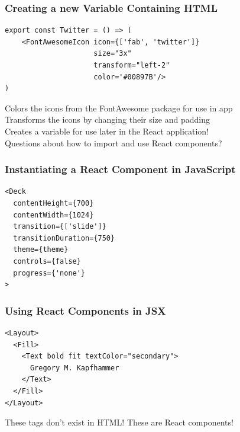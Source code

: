 \documentclass[14pt,aspectratio=169]{beamer}
\begin{document}
%
\begin{frame}[fragile]
  \frametitle{Creating a new Variable Containing HTML}
  \normalsize
  \hspace*{-.05in}
  \begin{minipage}{6in}
    \vspace*{.1in}
    \begin{verbatim}
export const Twitter = () => (
    <FontAwesomeIcon icon={['fab', 'twitter']}
                     size="3x"
                     transform="left-2"
                     color='#00897B'/>
)
    \end{verbatim}
  \end{minipage}
  \vspace*{.05in}
  \begin{center}
     Colors the icons from the FontAwesome package for use in app \\
     Transforms the icons by changing their size and padding \\
     Creates a variable for use later in the React application! \\
     Questions about how to import and use React components?
  \end{center}
\end{frame}

%
\begin{frame}[fragile]
  \frametitle{Instantiating a React Component in JavaScript}
  \normalsize
  \hspace*{.2in}
  \begin{minipage}{6in}
    \vspace*{.2in}
    \begin{verbatim}
<Deck
  contentHeight={700}
  contentWidth={1024}
  transition={['slide']}
  transitionDuration={750}
  theme={theme}
  controls={false}
  progress={'none'}
>
    \end{verbatim}
  \end{minipage}
\end{frame}

%
\begin{frame}[fragile]
  \frametitle{Using React Components in JSX}
  \normalsize
  \hspace*{-.1in}
  \begin{minipage}{6in}
    \vspace*{.2in}
    \begin{verbatim}
<Layout>
  <Fill>
    <Text bold fit textColor="secondary">
      Gregory M. Kapfhammer
    </Text>
  </Fill>
</Layout>
    \end{verbatim}
  \end{minipage}
  \vspace*{.1in}
  \begin{center}
    These tags don't exist in HTML! These are React components! \\
  \end{center}
\end{frame}
\end{document}
